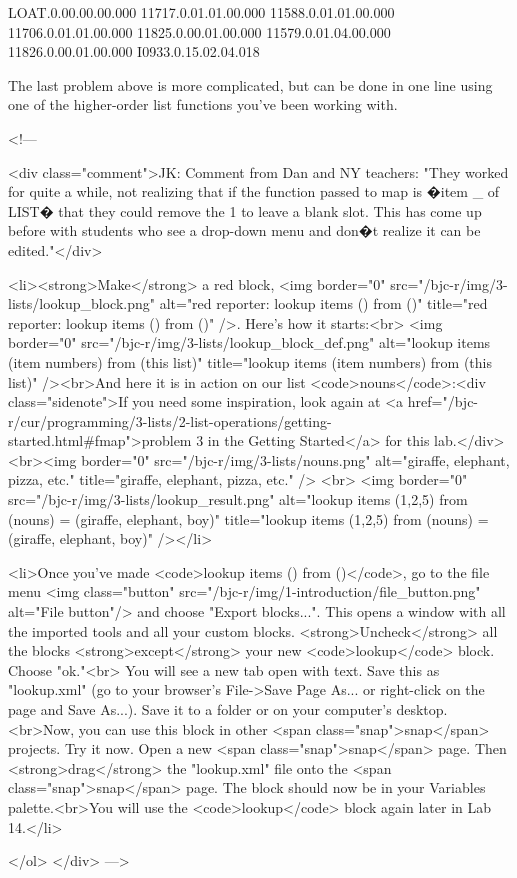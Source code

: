 LOAT.0.00.00.00.000
11717.0.01.01.00.000
11588.0.01.01.00.000
11706.0.01.01.00.000
11825.0.00.01.00.000
11579.0.01.04.00.000
11826.0.00.01.00.000
I0933.0.15.02.04.018




The last problem above is more complicated, but can be done in one line using one of the higher-order list functions you've been working with. 





<!---        

<div class="comment">JK: Comment from Dan and NY teachers: "They worked for quite a while, not realizing that if the function passed to map is �item _ of LIST� that they could remove the 1 to leave a blank slot.  This has come up before with students who see a drop-down menu and don�t realize it can be edited."</div>
        
        <li><strong>Make</strong> a red block, <img border="0" src="/bjc-r/img/3-lists/lookup_block.png" alt="red reporter: lookup items () from ()" title="red reporter: lookup items () from ()" />. Here's how it starts:<br> <img border="0" src="/bjc-r/img/3-lists/lookup_block_def.png" alt="lookup items (item numbers) from (this list)" title="lookup items (item numbers) from (this list)" /><br>And here it is in action on our list <code>nouns</code>:<div class="sidenote">If you need some inspiration, look again at <a href="/bjc-r/cur/programming/3-lists/2-list-operations/getting-started.html#fmap">problem 3 in the Getting Started</a> for this lab.</div><br><img border="0" src="/bjc-r/img/3-lists/nouns.png" alt="giraffe, elephant, pizza, etc." title="giraffe, elephant, pizza, etc." /> <br> <img border="0" src="/bjc-r/img/3-lists/lookup_result.png" alt="lookup items (1,2,5) from (nouns) = (giraffe, elephant, boy)" title="lookup items (1,2,5) from (nouns) = (giraffe, elephant, boy)" /></li>
        

 
        
        
        
        
        
        
        
        
                
        <li>Once you've made <code>lookup items () from ()</code>, go to the file menu <img class="button" src="/bjc-r/img/1-introduction/file_button.png" alt="File button"/> and choose "Export blocks...". This opens a window with all the imported tools and all your custom blocks. <strong>Uncheck</strong> all the blocks <strong>except</strong> your new <code>lookup</code> block. Choose "ok."<br> You will see a new tab open with text. Save this as "lookup.xml" (go to your browser's File->Save Page As... or right-click on the page and Save As...). Save it to a folder or on your computer's desktop.<br>Now, you can use this block in other <span class="snap">snap</span> projects. Try it now. Open a new <span class="snap">snap</span> page. Then <strong>drag</strong> the "lookup.xml" file onto the <span class="snap">snap</span> page. The block should now be in your Variables palette.<br>You will use the <code>lookup</code> block again later in Lab 14.</li>
        
    </ol>
    </div>
--->